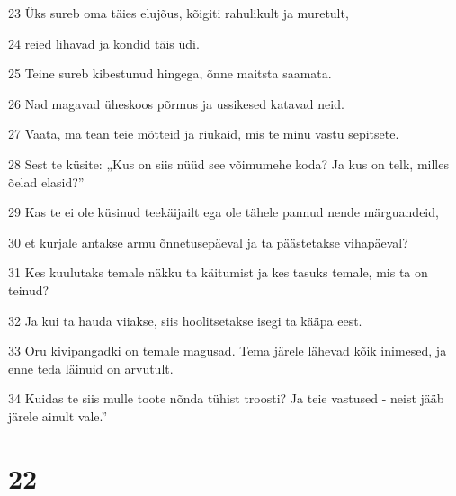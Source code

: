 \par 23 Üks sureb oma täies elujõus, kõigiti rahulikult ja muretult,
\par 24 reied lihavad ja kondid täis üdi.
\par 25 Teine sureb kibestunud hingega, õnne maitsta saamata.
\par 26 Nad magavad üheskoos põrmus ja ussikesed katavad neid.
\par 27 Vaata, ma tean teie mõtteid ja riukaid, mis te minu vastu sepitsete.
\par 28 Sest te küsite: „Kus on siis nüüd see võimumehe koda? Ja kus on telk, milles õelad elasid?”
\par 29 Kas te ei ole küsinud teekäijailt ega ole tähele pannud nende märguandeid,
\par 30 et kurjale antakse armu õnnetusepäeval ja ta päästetakse vihapäeval?
\par 31 Kes kuulutaks temale näkku ta käitumist ja kes tasuks temale, mis ta on teinud?
\par 32 Ja kui ta hauda viiakse, siis hoolitsetakse isegi ta kääpa eest.
\par 33 Oru kivipangadki on temale magusad. Tema järele lähevad kõik inimesed, ja enne teda läinuid on arvutult.
\par 34 Kuidas te siis mulle toote nõnda tühist troosti? Ja teie vastused - neist jääb järele ainult vale.”

\chapter{22}

